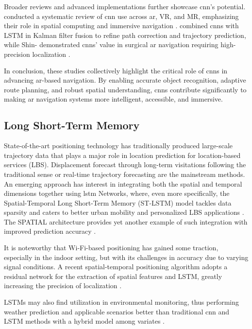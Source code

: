 \begin{refsection}
Broader reviews and advanced implementations further showcase \gls{cnn}'s potential. \citeauthor{nineteen} \citeyear{nineteen} conducted a systematic review of \gls{cnn} use across \gls{ar}, VR, and MR, emphasizing their role in spatial computing and immersive navigation \cite{nineteen}. \citeauthor{twentyfour} \citeyear{twentyfour} combined \gls{cnn}s with LSTM in Kalman filter fusion to refine path correction and trajectory prediction, while Shin-\citeauthor{twentythree} \citeyear{twentythree} demonstrated \gls{cnn}s’ value in surgical \gls{ar} navigation requiring high-precision localization \cite{twentyfour, twentythree}.

In conclusion, these studies collectively highlight the critical role of \gls{cnn}s in advancing \gls{ar}-based navigation. By enabling accurate object recognition, adaptive route planning, and robust spatial understanding, \gls{cnn}s contribute significantly to making \gls{ar} navigation systems more intelligent, accessible, and immersive.

\subsection{Long Short-Term Memory}

State-of-the-art positioning technology has traditionally produced large-scale trajectory data that plays a major role in location prediction for location-based services (LBS). Displacement forecast through long-term visitations following the traditional sense or real-time trajectory forecasting are the mainstream methods. An emerging approach has interest in integrating both the spatial and temporal dimensions together using \gls{lstm} Networks, where, even more specifically, the Spatial-Temporal Long Short-Term Memory (ST-LSTM) model tackles data sparsity and caters to better urban mobility and personalized LBS applications \cite{twentysix}. The SPATIAL architecture provides yet another example of such integration with improved prediction accuracy \cite{twentyseven}.

It is noteworthy that Wi-Fi-based positioning has gained some traction, especially in the indoor setting, but with its challenges in accuracy due to varying signal conditions. A recent spatial-temporal positioning algorithm adopts a residual network for the extraction of spatial features and LSTM, greatly increasing the precision of localization \cite{twentyeight}.

LSTMs may also find utilization in environmental monitoring, thus performing weather prediction and applicable scenarios better than traditional \gls{cnn} and LSTM methods with a hybrid model among variates \cite{twentynine}.


\end{refsection}
